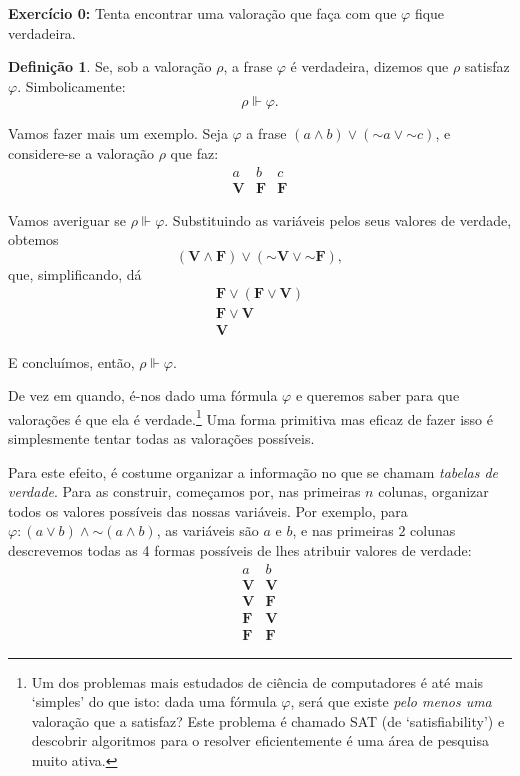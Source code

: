 \documentclass{article}
\theoremstyle{definition}
\newtheorem{definicao}{Definição}
\theoremstyle{remark}
\newcommand{\V}{\mathbf{V}}
\newcommand{\F}{\mathbf{F}}
\newcommand*{\lneg}{\mathord{\sim}}
\begin{document}
	\textbf{Exercício 0:} Tenta encontrar uma valoração que faça com que $\varphi$ fique verdadeira.
	
	\begin{definicao}
	Se, sob a valoração $\rho$, a frase $\varphi$ é verdadeira, dizemos que $\rho$ satisfaz $\varphi$. Simbolicamente:
	\[\rho \Vdash \varphi.\]
	\end{definicao}
	
	Vamos fazer mais um exemplo. Seja $\varphi$ a frase $(a \land b) \lor (\lneg a \lor \lneg c)$, e considere-se a valoração $\rho$ que faz:
	\[
	\begin{array}{c|c|c}
	a & b & c\\
	\hline
	\V & \F & \F
	\end{array}
	\]
	
	Vamos averiguar se $\rho \Vdash \varphi$. Substituindo as variáveis pelos seus valores de verdade, obtemos
	\[(\V \land \F) \lor (\lneg \V \lor \lneg \F),\]
	que, simplificando, dá
	\begin{gather*}
	\F \lor (\F \lor \V)\\
	\F \lor \V\\
	\V
	\end{gather*}
	
	E concluímos, então, $\rho \Vdash \varphi$.
	
	\smallskip
	
	De vez em quando, é-nos dado uma fórmula $\varphi$ e queremos saber para que valorações é que ela é verdade.\footnote{Um dos problemas mais estudados de ciência de computadores é até mais `simples' do que isto: dada uma fórmula $\varphi$, será que existe \emph{pelo menos uma} valoração que a satisfaz? Este problema é chamado SAT (de `satisfiability') e descobrir algoritmos para o resolver eficientemente é uma área de pesquisa muito ativa.} Uma forma primitiva mas eficaz de fazer isso é simplesmente tentar todas as valorações possíveis.
	
	Para este efeito, é costume organizar a informação no que se chamam \emph{tabelas de verdade}. Para as construir, começamos por, nas primeiras $n$ colunas, organizar todos os valores possíveis das nossas variáveis. Por exemplo, para $\varphi: (a \lor b) \land \lneg (a \land b)$, as variáveis são $a$ e $b$, e nas primeiras $2$ colunas descrevemos todas as 4 formas possíveis de lhes atribuir valores de verdade:
	\[
	\begin{array}{c|c}
	a & b\\
	\hline
	\V & \V\\
	\V & \F\\
	\F & \V\\
	\F & \F
	\end{array}
	\]
	
\end{document}
